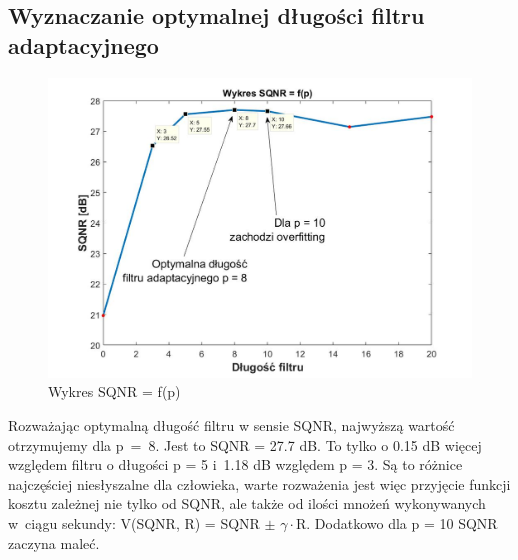 \documentclass[12pt, a4paper, oneside]{article}
\begin{document}
\subsection{Wyznaczanie optymalnej długości filtru adaptacyjnego}
\begin{figure}[h]
\centering
\caption{Wykres SQNR = f(p)}
\includegraphics[scale=0.33]{f11.jpg}
\end{figure}
Rozważając optymalną długość filtru w sensie SQNR, najwyższą wartość otrzymujemy dla p~=~8. Jest to SQNR = 27.7 dB. To tylko o 0.15 dB więcej względem filtru o długości p = 5 i~1.18 dB względem p = 3. Są to różnice najczęściej niesłyszalne dla człowieka, warte rozważenia jest więc przyjęcie funkcji kosztu zależnej nie tylko od SQNR, ale także od ilości mnożeń wykonywanych w~ciągu sekundy: V(SQNR, R) = SQNR $\pm$ $\gamma\cdot$R. Dodatkowo dla p = 10 SQNR zaczyna maleć.
\end{document}
